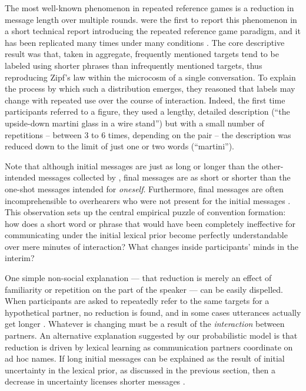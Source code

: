 The most well-known phenomenon in repeated reference games is a reduction in message length over multiple rounds. 
 were the first to report this phenomenon in a short technical report introducing the repeated reference game paradigm, and it has been replicated many times under many conditions \cite<most notably by>[in a much more streamlined experimental design using tangram shapes]{ClarkWilkesGibbs86_ReferringCollaborative}. 
The core descriptive result was that, taken in aggregate, frequently mentioned targets tend to be labeled using shorter phrases than infrequently mentioned targets, thus reproducing Zipf's law within the microcosm of a single conversation. To explain the process by which such a distribution emerges, they reasoned that labels may change with repeated use over the course of interaction. Indeed, the first time participants referred to a figure, they used a lengthy, detailed description (``the upside-down martini glass in a wire stand'') but with a small number of repetitions -- between 3 to 6 times, depending on the pair -- the description was reduced down to the limit of just one or two words (``martini''). 

Note that although initial messages are just as long or longer than the other-intended messages collected by , final messages are as short or shorter than the one-shot messages intended for \emph{oneself}. Furthermore, final messages are often incomprehensible to overhearers who were not present for the initial messages \cite{SchoberClark89_Overhearers}. This observation sets up the central empirical puzzle of convention formation: how does a short word or phrase that would have been completely ineffective for communicating under the initial lexical prior become perfectly understandable over mere minutes of interaction? What changes inside participants' minds in the interim? 

One simple non-social explanation --- that reduction is merely an effect of familiarity or repetition on the part of the speaker --- can be easily dispelled. 
When participants are asked to repeatedly refer to the same targets for a hypothetical partner, no reduction is found, and in some cases utterances actually get longer \cite{HupetChantraine92_CollaborationOrRepitition}. 
Whatever is changing must be a result of the \emph{interaction} between partners. An alternative explanation suggested by our probabilistic model is that reduction is driven by lexical learning as communication partners coordinate on ad hoc names. 
If long initial messages can be explained as the result of initial uncertainty in the lexical prior, as discussed in the previous section, then a decrease in uncertainty licenses shorter messages \cite{HawkinsFrankGoodman17_ConventionFormation}. 

